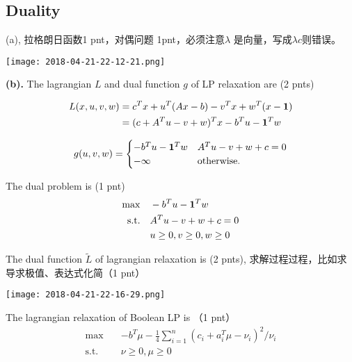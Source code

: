 \documentclass[12pt]{article}
\begin{document}
\subsection{Duality} 

(a), 拉格朗日函数1 pnt，对偶问题 1pnt，必须注意$\lambda$ 是向量，写成$\lambda c$则错误。
\begin{center}
	\texttt{[image: 2018-04-21-22-12-21.png]}
\end{center}

\textbf{(b).} The lagrangian $L$ and dual function $g$ of LP relaxation are (2 pnts) 

\begin{equation}
	\begin{aligned}
		L(x,u,v, w) & = c^Tx+ u^T(Ax-b) - v^T x+w^T (x- \mathbf{1}) \\ 
		& = (c+A^T u -v+w )^T x -b^T u - \mathbf{1}^T w \\ 
	\end{aligned}
\end{equation}

\[ g(u,v,w) = \begin{cases}
	-b^T u -\mathbf{1} ^T w & A^T u -v +w+c=0 \\   
	- \infty & \text{otherwise.} 
\end{cases}
\] 

The dual problem is (1 pnt) 
\begin{equation}
	\begin{aligned}
		\max \quad & -b^T u - \mathbf{1}^T w \\ 
		\textrm{s.t.} \quad & A^T u -v +w+c=0 \\ 
		& u \ge 0,   v \ge 0, w \ge 0 \\ 
	\end{aligned}
\end{equation}

The dual function $\tilde{L}$ of lagrangian relaxation  is (2 pnts),  求解过程过程，比如求导求极值、表达式化简（1 pnt）

\begin{center}
	\texttt{[image: 2018-04-21-22-16-29.png]}
\end{center}

The lagrangian relaxation of Boolean LP  is （1 pnt）
\begin{equation} \label{eq:lp}
	\begin{aligned} 
		\max \quad & -b^T \mu -\frac{1}{4} \sum_{i=1}^{n} ( c_i + a_i^T \mu -\nu_i)^2 / \nu_i \\ 
		\textrm{s.t.} \quad & \nu \ge 0, \mu \ge 0  
	\end{aligned}
\end{equation}
\end{document}
